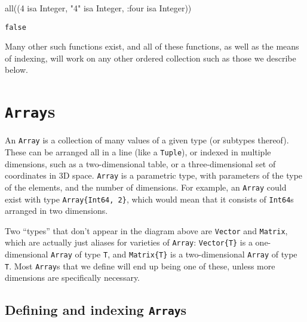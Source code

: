 \documentclass[
  letterpaper,
  DIV=11,
  numbers=noendperiod]{scrreprt}
\newenvironment{Shaded}{\begin{snugshade}}{\end{snugshade}}
\newcommand{\DataTypeTok}[1]{\textcolor[rgb]{0.68,0.00,0.00}{#1}}
\newcommand{\FloatTok}[1]{\textcolor[rgb]{0.68,0.00,0.00}{#1}}
\newcommand{\FunctionTok}[1]{\textcolor[rgb]{0.28,0.35,0.67}{#1}}
\newcommand{\NormalTok}[1]{\textcolor[rgb]{0.00,0.23,0.31}{#1}}
\newcommand{\OperatorTok}[1]{\textcolor[rgb]{0.37,0.37,0.37}{#1}}
\newcommand{\StringTok}[1]{\textcolor[rgb]{0.13,0.47,0.30}{#1}}
\begin{document}
\begin{Shaded}
\begin{Highlighting}[]
\FunctionTok{all}\NormalTok{((}\FloatTok{4}\NormalTok{ isa }\DataTypeTok{Integer}\NormalTok{, }\StringTok{"4"}\NormalTok{ isa }\DataTypeTok{Integer}\NormalTok{, }\OperatorTok{:}\NormalTok{four isa }\DataTypeTok{Integer}\NormalTok{))}
\end{Highlighting}
\end{Shaded}

\begin{verbatim}
false
\end{verbatim}

Many other such functions exist, and all of these functions, as well as
the means of indexing, will work on any other ordered collection such as
those we describe below.

\hypertarget{arrays}{%
\section{\texorpdfstring{\texttt{Array}s}{Arrays}}\label{arrays}}

An \texttt{Array} is a collection of many values of a given type (or
subtypes thereof). These can be arranged all in a line (like a
\texttt{Tuple}), or indexed in multiple dimensions, such as a
two-dimensional table, or a three-dimensional set of coordinates in 3D
space. \texttt{Array} is a parametric type, with parameters of the type
of the elements, and the number of dimensions. For example, an
\texttt{Array} could exist with type \texttt{Array\{Int64,\ 2\}}, which
would mean that it consists of \texttt{Int64}s arranged in two
dimensions.

Two ``types'' that don't appear in the diagram above are \texttt{Vector}
and \texttt{Matrix}, which are actually just aliases for varieties of
\texttt{Array}: \texttt{Vector\{T\}} is a one-dimensional \texttt{Array}
of type \texttt{T}, and \texttt{Matrix\{T\}} is a two-dimensional
\texttt{Array} of type \texttt{T}. Most \texttt{Array}s that we define
will end up being one of these, unless more dimensions are specifically
necessary.

\hypertarget{defining-and-indexing-arrays}{%
\subsection{\texorpdfstring{Defining and indexing
\texttt{Array}s}{Defining and indexing Arrays}}\label{defining-and-indexing-arrays}}
\end{document}
